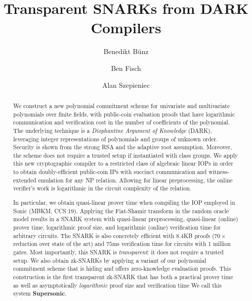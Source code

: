 \documentclass[12pt]{article}
\theoremstyle{definition}
\begin{document}
\title{Transparent SNARKs from DARK Compilers}
 \author[1]{Benedikt B\"unz}
 \author[1]{Ben Fisch} 
 \author[2]{Alan Szepieniec} 

\maketitle

\begin{abstract} 
We construct a new polynomial commitment scheme for univariate and multivariate polynomials over finite fields, with public-coin evaluation proofs that have logarithmic communication and verification cost in the number of coefficients of the polynomial. The underlying technique is a \emph{Diophantine Argument of Knowledge} (DARK), leveraging integer representations of polynomials and groups of unknown order. Security is shown from the strong RSA and the adaptive root assumption. Moreover, the scheme does not require a trusted setup if instantiated with class groups. We apply this new cryptographic compiler to a restricted class of algebraic linear IOPs in order to obtain doubly-efficient public-coin IPs with succinct communication and witness-extended emulation for any NP relation. Allowing for linear preprocessing, the online verifier's work is logarithmic in the circuit complexity of the relation.

In particular, we obtain quasi-linear prover time when compiling the IOP employed in Sonic (MBKM, CCS 19). Applying the Fiat-Shamir transform in the random oracle model results in a SNARK system with quasi-linear preprocessing, quasi-linear (online) prover time, logarithmic proof size, and logarithmic (online) verification time for arbitrary circuits. The SNARK is also concretely efficient with $8.4$KB proofs ($70\times$ reduction over state of the art) and $75$ms verification time for circuits with 1 million gates. Most importantly, this SNARK is \emph{transparent}: it does not require a trusted setup. We also obtain zk-SNARKs by applying a variant of our polynomial commitment scheme that is hiding and offers zero-knowledge evaluation proofs. This construction is the first transparent zk-SNARK that has both a practical prover time as well as asymptotically \emph{logarithmic} proof size and verification time 
We call this system \textsf{\textbf{Supersonic}}.

\end{abstract} 
\end{document}

